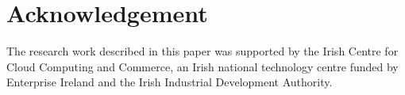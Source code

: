 \documentclass[10pt, conference, compsocconf]{IEEEtran}
\begin{document}
\section{Acknowledgement}
The research work described in this paper was supported by the Irish Centre for Cloud Computing and Commerce, an Irish national technology centre funded by Enterprise Ireland and the Irish Industrial Development Authority.



\ifCLASSOPTIONcaptionsoff
  \newpage
\fi





\balance


\end{document}
